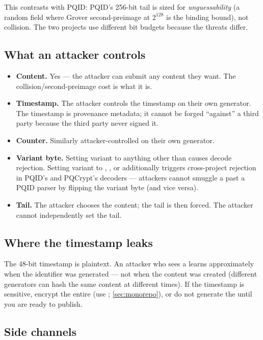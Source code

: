 This contrasts with PQID: PQID's 256-bit tail is sized for \emph{unguessability} (a random field where Grover second-preimage at $2^{128}$ is the binding bound), not collision. The two projects use different bit budgets because the threats differ.

\subsection{What an attacker controls}

\begin{itemize}
  \item \textbf{Content.} Yes --- the attacker can submit any content they want. The collision/second-preimage cost is what it is.
  \item \textbf{Timestamp.} The attacker controls the timestamp on their own generator. The timestamp is provenance metadata; it cannot be forged ``against'' a third party because the third party never signed it.
  \item \textbf{Counter.} Similarly attacker-controlled on their own generator.
  \item \textbf{Variant byte.} Setting variant to anything other than  causes decode rejection. Setting variant to , , or  additionally triggers cross-project rejection in PQID's and PQCrypt's decoders --- attackers cannot smuggle a \pqhash{} past a PQID parser by flipping the variant byte (and vice versa).
  \item \textbf{Tail.} The attacker chooses the content; the tail is then forced. The attacker cannot independently set the tail.
\end{itemize}

\subsection{Where the timestamp leaks}

The 48-bit timestamp is plaintext. An attacker who sees a \pqhash{} learns approximately when the identifier was generated --- not when the content was created (different generators can hash the same content at different times). If the timestamp is sensitive, encrypt the entire \pqhash{} (use \pqcrypt{}; \cref{sec:monorepo}), or do not generate the \pqhash{} until you are ready to publish.

\subsection{Side channels}

